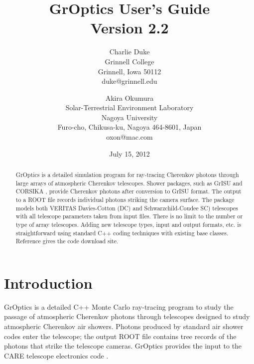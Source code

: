 \documentclass{article}
\begin{document}
\title{GrOptics User's Guide \\ Version 2.2}
\author{Charlie Duke \\
Grinnell College \\
Grinnell, Iowa 50112 \\
duke@grinnell.edu
\and
Akira Okumura \\
Solar-Terrestrial Environment Laboratory 
\\Nagoya University \\
Furo-cho, Chikusa-ku, Nagoya 464-8601, Japan \\
oxon@mac.com}

\date{July 15, 2012}

\maketitle
\begin{abstract}

GrOptics is a detailed simulation program for ray-tracing Cherenkov photons
through large arrays of atmospheric Cherenkov telescopes. Shower packages, such
as GrISU \cite{GRISU} and CORSIKA \cite{CORSIKA}, provide Cherenkov 
photons after conversion to GrISU format. 
The output to a ROOT file records
individual photons striking the camera surface.  The package models
both VERITAS Davies-Cotton (DC) and Schwarzchild-Coudee SC) 
telescopes with all
telescope parameters taken from input files. There is no limit to the number
or type of array telescopes. Adding new telescope types, input and
output formats, etc. is 
straightforward using standard C++ coding techniques with existing base
classes. Reference \cite{GROPTICS} gives the code download site.
       
\end{abstract}
\section{Introduction}\label{S:INTRO}
GrOptics is a detailed C++ Monte Carlo ray-tracing program to 
study the passage of 
atmospheric Cherenkov photons through telescopes designed to study 
atmospheric Cherenkov air showers.  
Photons produced by standard air shower 
codes enter the telescope; the output 
ROOT file contains tree records of the photons that strike the telescope
cameras.  GrOptics provides the input to the CARE  telescope 
electronics code \cite{CARE}.
\end{document}
